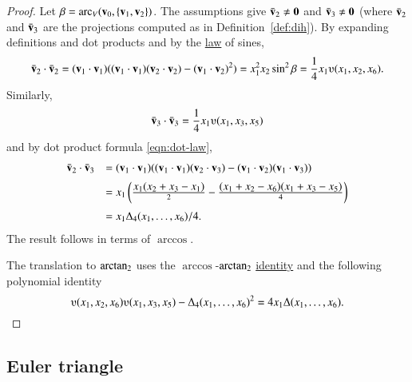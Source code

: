 \begin{proof}
Let $\beta = \operatorname{arc}_V({\mathbf v}_0,\{{\mathbf v}_1,{\mathbf v}_2\})$.
The assumptions give $\bar {{\mathbf v}}_2\ne {\mathbf 0}$ and 
$\bar {{\mathbf v}}_3 \ne {\mathbf 0}$ (where $\bar {{\mathbf v}}_2$ and
$\bar {{\mathbf v}}_3$ are the projections computed as in Definition~\ref{def:dih}).  
%
    By expanding definitions and dot products and by the \hyperref[lemma:los]{law} of sines,
    \begin{displaymath}
    \bar \v_2\cdot \bar \v_2 = (\v_1\cdot \v_1) ((\v_1\cdot \v_1)(\v_2\cdot \v_2) -
    (\v_1\cdot \v_2)^2) =  x_1^2 x_2 \sin^2 \beta = \frac{1}{4}
    x_1
    \ups(x_1,x_2,x_6).
    \end{displaymath}
    Similarly,
    \begin{displaymath}\bar \v_3 \cdot \bar \v_3 = \frac{1}{4} x_1 \ups(x_1,x_3,x_5)\end{displaymath}
and by dot product formula \eqref{eqn:dot-law},
    \begin{displaymath}\begin{array}{lll}
    \bar \v_2\cdot \bar \v_3 &= (\v_1\cdot \v_1)((\v_1\cdot \v_1)(\v_2\cdot \v_3) -
    (\v_1\cdot \v_2)(\v_1\cdot \v_3) ) \vspace{6pt} \\  &
    = x_1 \left(\frac{\displaystyle x_1 (x_2 + x_3 -
    x_1)}{2} - \frac{\displaystyle (x_1 + x_2 - x_6)(x_1 + x_3 -
    x_5)}{4} \right)\vspace{6pt}\\&
    = {x_1\Delta_4(x_1,\ldots,x_6)}/{4}.
    \end{array}
    \end{displaymath}
The result follows in terms of $\arccos$.

The translation to ${\operatorname{arctan_2}}$ uses the $\arccos$-${\operatorname{arctan_2}}$ \hyperref[lemma:arccos-arctan]{identity}
and the following polynomial identity
    \begin{displaymath}
    \ups(x_1,x_2,x_6)\ups(x_1,x_3,x_5) - \Delta_4(x_1,\ldots,x_6)^2
    = 4 x_1 \Delta(x_1,\ldots,x_6).
    \end{displaymath}
\end{proof}






\subsection{Euler triangle}

